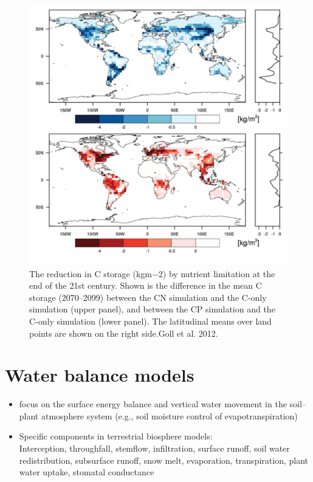 \documentclass[
  12pt,
  oneside]{book}
\begin{document}
\begin{figure}

{\centering \includegraphics[width=0.8\linewidth]{figures/chap5/f524_gool_sink_map} 

}

\caption{The reduction in C storage (kgm−2) by nutrient limitation at the end of the 21st century. Shown is the difference in the mean C storage (2070–2099) between the CN simulation and the C-only simulation (upper panel), and between the CP simulation and the C-only simulation (lower panel). The latitudinal means over land points are shown on the right side.Goll et al. 2012.}\label{fig:f524}
\end{figure}

\hypertarget{water-balance-models}{%
\section{Water balance models}\label{water-balance-models}}

\begin{itemize}
\item
  focus on the surface energy balance and vertical water movement in the soil--plant atmosphere system (e.g., soil moisture control of evapotranspiration)
\item
  Specific components in terrestrial biosphere models:\\
  Interception, throughfall, stemflow, infiltration, surface runoff, soil water redistribution, subsurface runoff, snow melt, evaporation, transpiration, plant water uptake, stomatal conductance
\end{itemize}
\end{document}
